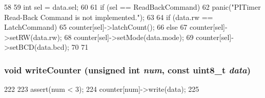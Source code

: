 \begin{DoxyCode}
58 {
59     int sel = data.sel;
60 
61     if (sel == ReadBackCommand)
62        panic("PITimer Read-Back Command is not implemented.\n");
63 
64     if (data.rw == LatchCommand)
65         counter[sel]->latchCount();
66     else {
67         counter[sel]->setRW(data.rw);
68         counter[sel]->setMode(data.mode);
69         counter[sel]->setBCD(data.bcd);
70     }
71 }
\end{DoxyCode}
\hypertarget{classIntel8254Timer_aa5af88439002d1cfeb0189113dfe4627}{
\subsubsection[{writeCounter}]{\setlength{\rightskip}{0pt plus 5cm}void writeCounter (unsigned int {\em num}, \/  const uint8\_\-t {\em data})}}
\label{classIntel8254Timer_aa5af88439002d1cfeb0189113dfe4627}



\begin{DoxyCode}
222     {
223         assert(num < 3);
224         counter[num]->write(data);
225     }
\end{DoxyCode}


